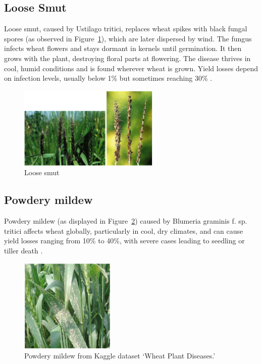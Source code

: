\subsection{Loose Smut}

Loose smut, caused by Ustilago tritici, replaces wheat spikes with black fungal spores (as observed in Figure~\ref{fig:Figure08}), which are later dispersed by wind. The fungus infects wheat flowers and stays dormant in kernels until germination. It then grows with the plant, destroying floral parts at flowering. The disease thrives in cool, humid conditions and is found wherever wheat is grown. Yield losses depend on infection levels, usually below 1\% but sometimes reaching 30\% \parencite{duveiller2012wheat}.

\begin{figure}[H]
    \centering
    \includegraphics[width=0.6\textwidth]{chapters/chapter2/images/Figure08.png}
    \caption{Loose smut \protect\parencite{duveiller2012wheat}}
    \label{fig:Figure08}
\end{figure}

\subsection{Powdery mildew} 

Powdery mildew (as displayed in Figure~\ref{fig:Figure09}) caused by Blumeria graminis f. sp. tritici affects wheat globally, particularly in cool, dry climates, and can cause yield losses ranging from 10\% to 40\%, with severe cases leading to seedling or tiller death \parencite{singh2023wheat}.

\begin{figure}[H]
    \centering
    \includegraphics[width=0.4\textwidth]{chapters/chapter2/images/Figure09.png}
    \caption{Powdery mildew from Kaggle dataset ‘Wheat Plant Diseases.'}
    \label{fig:Figure09}
\end{figure}
